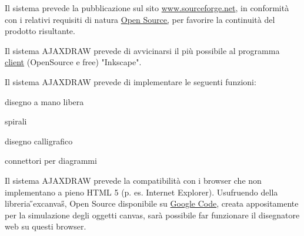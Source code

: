 \begin{elenconumerato}{\subsecindent}
\item Il sistema prevede la pubblicazione sul sito \href{www.sourceforge.net}{www.sourceforge.net}, in conformit\`a con i relativi requisiti di natura \underline{Open Source,} per favorire la continuit\`a del prodotto risultante.
\end{elenconumerato}

\begin{elenconumerato}{\subsecindent}
\item Il sistema AJAXDRAW prevede di avvicinarsi il pi\`u possibile al programma {\underline{client}} (OpenSource e free) "Inkscape". 
\item Il sistema AJAXDRAW prevede di implementare le seguenti funzioni:

\begin{list}{-}{}
\item disegno a mano libera
\item spirali
\item disegno calligrafico
\item connettori per diagrammi
\end{list}

\item Il sistema AJAXDRAW prevede la compatibilit\`a con i browser che non implementano a pieno HTML 5 (p. es. Internet Explorer). Usufruendo della libreria \H{}excanvas\H{}, Open Source disponibile su \href{http://code.google.com/p/explorercanvas/}{Google Code}, creata appositamente per la simulazione degli oggetti canvas, sar\`a possibile far funzionare il disegnatore web su questi browser. 
\end{elenconumerato}


